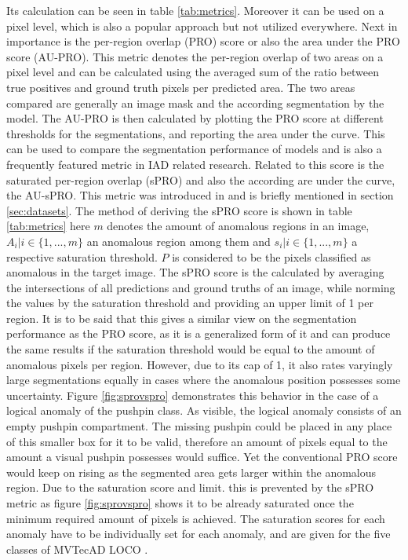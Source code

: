 Its calculation can be seen in 
table \ref{tab:metrics}. Moreover it can be used on a pixel level, which is also a popular approach but not utilized everywhere.
Next in importance is the per-region overlap (PRO) score or also the area under the PRO score (AU-PRO). This metric denotes the per-region overlap of two areas 
on a pixel level and can be calculated using the averaged sum of the ratio between true positives and ground truth pixels per predicted area. The two areas 
compared are generally an image mask and the according segmentation by the model. The AU-PRO is then calculated by plotting the PRO score 
at different thresholds for the segmentations, and reporting the area under the curve. This can be 
used to compare the segmentation performance of models and is also a frequently featured metric in IAD related research. 
Related to this score is the saturated per-region overlap (sPRO) and also the according are under the curve, the AU-sPRO. This metric was 
introduced in \cite{LOCODentsAndScratchesBergmann2022} and is briefly mentioned in section \ref{sec:datasets}. The method of deriving the sPRO 
score is shown in table \ref{tab:metrics} here $m$ denotes the amount of anomalous regions in an image, $A_i | i \in \{1, ... , m\}$ an anomalous 
region among them and $s_i | i \in \{1, ... , m\}$ a respective saturation threshold. $P$ is considered to be the pixels classified as anomalous 
in the target image. The sPRO score is the calculated by averaging the intersections of all predictions and ground truths of an image, 
while norming the values by the saturation threshold and providing an upper limit of 1 per region. It is to be said that this gives a similar 
view on the segmentation performance as the PRO score, as it is a generalized form of it and can produce the same results if the saturation 
threshold would be equal to the amount of anomalous pixels per region. However, due to its cap of 1, it also rates varyingly large segmentations equally in cases 
where the anomalous position possesses some uncertainty. Figure \ref{fig:sprovspro} demonstrates this behavior in the case of a logical anomaly of the pushpin class. 
As visible, the logical anomaly consists of an empty pushpin compartment. The missing pushpin could be placed in any place of this smaller 
box for it to be valid, therefore an amount of pixels equal to the amount a visual pushpin possesses would suffice. Yet the conventional PRO score 
would keep on rising as the segmented area gets larger within the anomalous region. Due to the saturation score and limit. this is prevented 
by the sPRO metric as figure \ref{fig:sprovspro} shows it to be already saturated once the minimum required amount of pixels is achieved. The saturation 
scores for each anomaly have to be individually set for each anomaly, and are given for the five classes of MVTecAD LOCO \cite{LOCODentsAndScratchesBergmann2022}.

